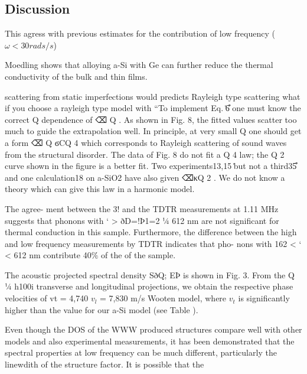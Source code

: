 \documentclass[aps,prb,twocolumn,superscriptaddress,footinbib,amsmath,amssymb,floatfix]{revtex4}
\begin{document}

\subsection{\label{S:Lifetimes}Discussion}

This agress with previous estimates for the contribution of low 
frequency ($\omega<30 rads/s$) \cite{love_estimate_1990}

Moedling shows that alloying a-Si with Ge can further reduce 
the thermal conductivity of the bulk and thin films.
\cite{bouchard_vibrational_1988,feldman_thermal_1993} 

scattering from static imperfections would predicts Rayleigh type 
scattering \cite{klemens_scattering_1955}
what if you choose a rayleigh type model with 
``To implement Eq. ͑6͒ one must know the
correct Q dependence of ⌫ Q . As shown in Fig. 8, the fitted
values scatter too much to guide the extrapolation well. In
principle, at very small Q one should get a form ⌫ Q ϭCQ 4
which corresponds to Rayleigh scattering of sound waves
from the structural disorder. The data of Fig. 8 do not fit a
Q 4 law; the Q 2 curve shown in the figure is a better fit. Two
experiments13,15 ͑but not a third35͒ and one calculation18 on
a-SiO2 have also given ⌫κQ 2 . We do not know a theory
which can give this law in a harmonic model.

The agree-
ment between the 3! and the TDTR measurements at
1.11 MHz suggests that phonons with ‘ > ðD=!Þ1=2 1⁄4
612 nm are not significant for thermal conduction in this
sample. Furthermore, the difference between the high and
low frequency measurements by TDTR indicates that pho-
nons with 162 < ‘ < 612 nm contribute 40$\%$ of the of
the sample.\cite{liu_high_2009}

The acoustic projected spectral density SðQ; EÞ is shown
in Fig. 3. From the Q 1⁄4 h100i transverse and longitudinal
projections, we obtain the respective phase velocities of
vt = 4,740 $v_l$ = 7,830 m/s Wooten model, where $v_t$ is 
significantly higher than the value for our a-Si model 
(see Table ).\cite{liu_high_2009} 

Even though the DOS of the WWW produced structures compare well with 
other models and also experimental measurements, it has been 
demonstrated that the spectral properties at low frequency can be 
much different, particularly the linewdith of the structure 
factor.\cite{liu_high_2009} It is possible that the 
\end{document}
